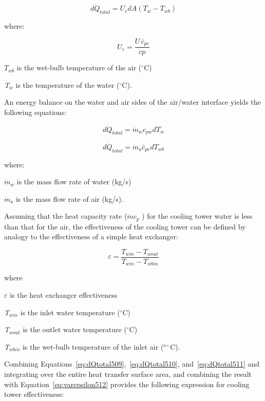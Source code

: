 \begin{equation}
d{\dot Q_{total}} = U_e dA\left( {{T_w} - {T_{wb}}} \right)
\label{eq:dQtotal509}
\end{equation}

where:

\begin{equation}
U_e = \frac{{U\,\bar c_{pe}}}{{cp}}
\end{equation}

\(T_{wb}\) is the wet-bulb temperature of the air (\(^{\circ}\)C)

\emph{T\(_{w}\)} is the temperature of the water (\(^{\circ}\)C).

An energy balance on the water and air sides of the air/water interface yields the following equations:

\begin{equation}
d{\dot Q_{total}} = {\dot m_w} c_{pw} dT_w
\label{eq:dQtotal510}
\end{equation}

\begin{equation}
d{\dot Q_{total}} = {\dot m_a} \bar c_{pe} dT_{wb}
\label{eq:dQtotal511}
\end{equation}

where:

\({\dot m_w}\) is the mass flow rate of water (kg/s)

\({\dot m_a}\) is the mass flow rate of air (kg/s).

Assuming that the heat capacity rate (\(\dot mc_p\) ) for the cooling tower water is less than that for the air, the effectiveness of the cooling tower can be defined by analogy to the effectiveness of a simple heat exchanger:

\begin{equation}
\varepsilon  = \frac{{{T_{win}} - {T_{wout}}}}{{{T_{win}} - {T_{wbin}}}}
\label{eq:varepsilon512}
\end{equation}

where

\emph{\(\varepsilon\)} is the heat exchanger effectiveness

\emph{T\(_{win}\)} is the inlet water temperature (\(^{\circ}\)C)

\emph{T\(_{wout}\)} is the outlet water temperature (\(^{\circ}\)C)

\emph{T\(_{wbin}\)} is the wet-bulb temperature of the inlet air (\(^{o\circ}\)C).

Combining Equations~\ref{eq:dQtotal509},~\ref{eq:dQtotal510}, and~\ref{eq:dQtotal511} and integrating over the entire heat transfer surface area, and combining the result with Equation~\ref{eq:varepsilon512} provides the following expression for cooling tower effectiveness:

